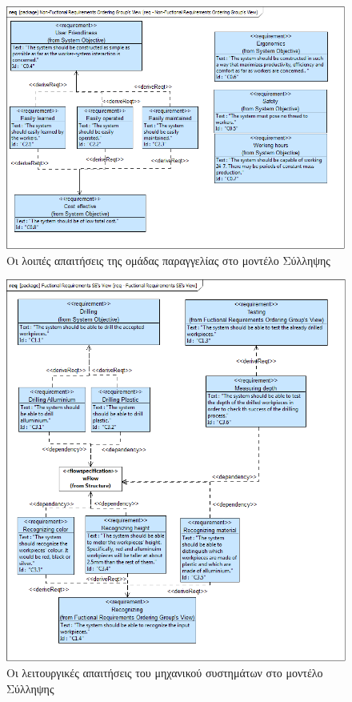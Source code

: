 \documentclass[a4paper,12pt,twoside]{report}
\begin{document}
{\begin{appendices}
				\begin{figure}[hp]
					\centering
					\includegraphics[scale=0.45]{ConceptionalModel_req-Non-FuctionalRequirementsOrderingGroupsView.png}
					\caption{Οι λοιπές απαιτήσεις της ομάδας παραγγελίας στο μοντέλο Σύλληψης}
					\label{φωτ:Οι λοιπές απαιτήσεις της ομάδας παραγγελίας στο μοντέλο Σύλληψης}
				\end{figure}
				
				\begin{figure}[hp]
					\centering
					\includegraphics[scale=0.45]{ConceptionalModel_req-FuctionalRequirementsSEsView.png}
					\caption{Οι λειτουργικές απαιτήσεις του μηχανικού συστημάτων στο μοντέλο Σύλληψης}
					\label{φωτ:Οι λειτουργικές απαιτήσεις του μηχανικού συστημάτων στο μοντέλο Σύλληψης}
				\end{figure}
				

\end{appendices}}
\end{document}
